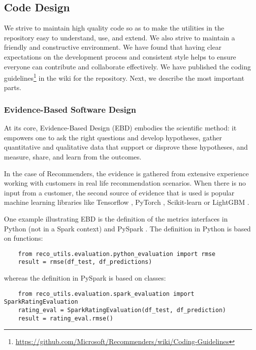 \subsection{Code Design}
\label{code-style}

We strive to maintain high quality code so as to make the utilities in the repository easy to 
understand, use, and extend. We also strive to maintain a friendly and constructive 
environment. We have found that having clear expectations on the development process 
and consistent style helps to ensure everyone can contribute and collaborate effectively.
We have published the coding 
guidelines\footnote{\url{https://github.com/Microsoft/Recommenders/wiki/Coding-Guidelines}\label{foot_code_guidelines}} 
in the wiki for the repository. Next, we describe the most important parts.

\subsubsection{Evidence-Based Software Design}
At its core, Evidence-Based Design (EBD) \cite{kembel2012architectural,joeglekar2018evidence} embodies the 
scientific method: it empowers one to ask the right questions and develop hypotheses, 
gather quantitative and qualitative data that support or disprove these hypotheses, 
and measure, share, and learn from the outcomes.

In the case of Recommenders, the evidence is gathered from extensive experience working 
with customers in real life recommendation scenarios. When there is no input from a 
customer, the second source of evidence that is used is popular machine learning
libraries like Tensorflow \cite{abadi2016tensorflow}, PyTorch \cite{paszke2017automatic},
Scikit-learn \cite{pedregosa2011scikit} or LightGBM \cite{ke2017lightgbm}.

One example illustrating EBD is the definition of the metrics interfaces in Python (not in a Spark context) and 
PySpark \cite{meng2016mllib}. The definition in Python is based on functions:

\begin{verbatim}
    from reco_utils.evaluation.python_evaluation import rmse
    result = rmse(df_test, df_predictions)
\end{verbatim}

whereas the definition in PySpark is based on classes:
\begin{verbatim}
    from reco_utils.evaluation.spark_evaluation import SparkRatingEvaluation
    rating_eval = SparkRatingEvaluation(df_test, df_prediction)
    result = rating_eval.rmse()
\end{verbatim}


